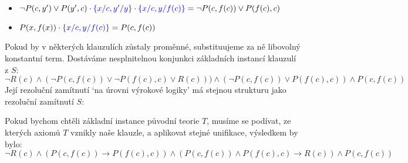 \begin{problem}
\begin{solution}
\begin{enumerate}[(a)]
\begin{itemize}
                \item $\neg P(c,y')\lor P(y',c)\cdot\textcolor{blue}{\{x/c,y'/y\}}\cdot\textcolor{blue}{\{x/c,y/f(c)\}}=\neg P(c,f(c))\lor P(f(c),c)$
                \item $P(x,f(x))\cdot\textcolor{blue}{\{x/c,y/f(c)\}}=P(c,f(c))$
            \end{itemize}
            Pokud by v některých klauzulích zůstaly proměnné, substituujeme za ně libovolný konstantní term. Dostáváme nesplnitelnou konjunkci základních instancí klauzulí z $S$:
            $$
            \neg R(c)\land (\neg P(c,f(c))\lor \neg P(f(c),c)\lor R(c)))\land (\neg P(c,f(c))\lor P(f(c),c))\land P(c,f(c))
            $$
            Její rezoluční zamítnutí `na úrovni výrokové logiky' má stejnou strukturu jako rezoluční zamítnutí $S$:
            
            \begin{minipage}{0.6\textwidth}
            \end{minipage}%
            \begin{minipage}{0.35\textwidth}
            \end{minipage} 
            Pokud bychom chtěli základní instance původní teorie $T$, musíme se podívat, ze kterých axiomů $T$ vznikly naše klauzle, a aplikovat stejné unifikace, výsledkem by bylo:
            $$
            \neg R(c)\land (P(c,f(c))\to P(f(c),c))\land (P(c,f(c))\land P(f(c),c)\to R(c))\land P(c,f(c))
            $$


        \end{enumerate}

    \end{solution}

\end{problem}

